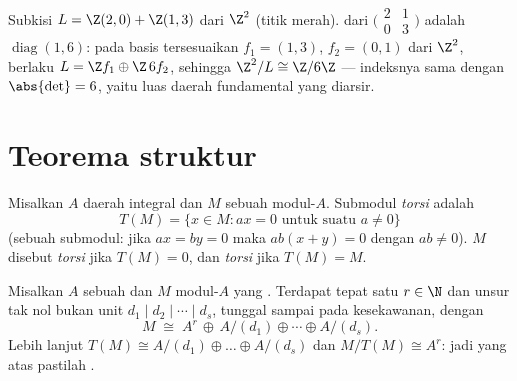 \begin{omfigure}

{\small Subkisi $L = \Z(2,0) + \Z(1,3)$ dari $\Z^2$ (titik
merah).  dari $\bigl(\begin{smallmatrix} 2 &
1\\ 0 & 3\end{smallmatrix}\bigr)$ adalah
$\operatorname{diag}(1, 6)$: pada basis tersesuaikan $f_1 = (1,3)$,
$f_2 = (0,1)$ dari $\Z^2$, berlaku $L = \Z f_1 \oplus \Z\,6f_2$, sehingga
$\Z^2/L \cong \Z/6\Z$ --- indeksnya sama dengan $\abs{\det} = 6$, yaitu
luas daerah fundamental yang diarsir.}
\end{omfigure}

\section{Teorema struktur}

\begin{definition}\label{def:b3:modules:torsion}
Misalkan $A$ daerah integral dan $M$ sebuah modul-$A$. Submodul
\emph{torsi} adalah
\[
T(M) = \{x \in M : ax = 0 \text{ untuk suatu } a \neq 0\}
\]
(sebuah submodul: jika $ax = by = 0$ maka $ab(x + y) = 0$ dengan $ab \ne 0$).
 $M$ disebut \emph{ torsi} jika $T(M) = 0$, dan \emph{ torsi}
jika $T(M) = M$.
\end{definition}

\begin{theorem}\label{thm:b3:modules:structure}
Misalkan $A$ sebuah  dan $M$ modul-$A$ yang . Terdapat
tepat satu $r \in \N$ dan unsur tak nol bukan unit $d_1 \mid d_2 \mid
\cdots \mid d_s$, tunggal sampai pada kesekawanan, dengan
\[
M \;\cong\; A^r \,\oplus\, A/(d_1) \oplus \cdots \oplus A/(d_s).
\]
Lebih lanjut $T(M) \cong A/(d_1)\oplus\dots\oplus A/(d_s)$ dan $M/T(M)
\cong A^r$: jadi  \emph{ } yang  atas
 pastilah .
\end{theorem}

